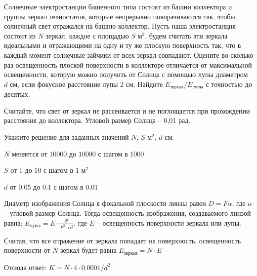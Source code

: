 
Солнечные электростанции башенного типа состоят из башни
коллектора и группы зеркал гелиостатов, которые непрерывно поворачиваются так,
чтобы солнечный свет отражался на башню коллектор. Пусть наша электростанция
состоит из $N$ зеркал, каждое с площадью $S$ м$^2$, будем считать эти зеркала идеальными и отражающими
на одну и ту же плоскую поверхность так, что в каждый момент солнечные зайчики
от всех зеркал совпадают. Оцените во сколько раз освещенность плоской
поверхности в коллекторе отличается от максимальной освещенности, которую можно
получить от Солнца с помощью лупы диаметром $d$ см, если фокусное расстояние лупы 2 см. Найдите $E_{\text{зеркал}}/E_{\text{лупы}}$ с точностью
до десятых.

Считайте, что
свет от зеркал не рассеивается и не поглощается при прохождении расстояния до
коллектора. Угловой размер Солнца – 0,01 рад.

Укажите решение для заданных значений $N$, $S$ м$^2$, $d$ см.

\paramSection

$N$ меняется от $10000$ до $10000$ с шагом в $1000$

$S$ от $1$ до $10$ с шагом в $1$ м$^2$

$d$ от $0.05$ до $0.1$ с шагом в $0.01$

\solutionSection

Диаметр изображения Солнца в фокальной плоскости линзы равен 
$D = F \alpha$, где  $\alpha$ – угловой размер Солнца. Тогда освещенность изображения, 
создаваемого линзой равна: $E_{\text{лупы}} = E \cdot \frac{d^2}{F^2 \cdot \alpha^2}$, где $E$ – освещенность 
поверхности зеркала или лупы.

Считая, что все отражение от зеркала попадает на поверхность, освещенность поверхности от $N$ зеркал будет 
равна $E_{\text{зеркал}} = N \cdot E$

Отсюда ответ:
		$K = N \cdot 4 \cdot 0.0001/d^2$

